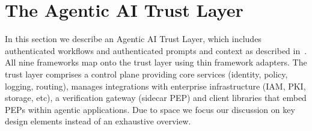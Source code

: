 \section{The Agentic AI Trust Layer}
\label{sec:trust-layer}

In this section we describe an Agentic AI Trust Layer, which includes authenticated workflows and authenticated prompts and context as described in~\cite{rajagopalan2025prompts}. All nine frameworks map onto the trust layer using thin framework adapters. The trust layer comprises a control plane providing core services (identity, policy, logging, routing), manages integrations with enterprise infrastructure (IAM, PKI, storage, etc), a verification gateway (sidecar PEP) and client libraries that embed PEPs within agentic applications. Due to space we focus our discussion on key design elements instead of an exhaustive overview.

